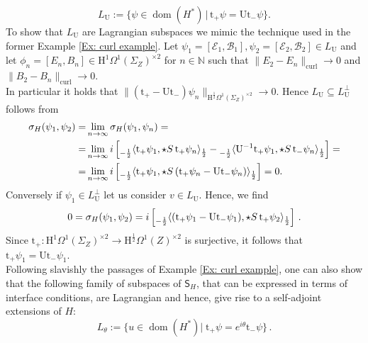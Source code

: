 \begin{Example}
	\begin{equation}
		L_\mathrm{U}:=\{\psi\in \operatorname{dom}(H^*)\,|\, \mathrm{t}_+\psi=\mathrm{U}\mathrm{t}_-\psi  \}.
	\end{equation}
	To show that $L_\mathrm{U}$ are Lagrangian subspaces we mimic the technique used in the former Example \ref{Ex: curl example}. Let $\psi_1=[\mathscr{E}_1,\mathscr{B}_1],\psi_2=[\mathscr{E}_2,\mathscr{B}_2]\in L_\mathrm{U}$ and let $\phi_n=[E_n,B_n]\in \mathrm{H}^1\Omega^1(\Sigma_Z)^{\times 2}$ for $n\in\mathbb{N}$ such that $\|E_2-E_n\|_{\operatorname{curl}}\to 0$ and $\|B_2-B_n\|_{\operatorname{curl}}\to 0$.\\ In particular it holds that $\|(\mathrm{t}_+-\mathrm{U}\mathrm{t}_-)\psi_n\|_{\mathrm{H}^{\frac12}\Omega^1(\Sigma_Z)^{\times 2}}\to 0$. Hence $L_\mathrm{U}\subseteq L_\mathrm{U}^\perp$ follows from
	\begin{align}
	\nonumber	\sigma_H (\psi_1,\psi_2)=&\lim_{n\to \infty} \sigma_H (\psi_1,\psi_n)=\\ =&\lim_{n\to \infty} i\left[	\prescript{}{-\frac{1}{2}}{\langle} \mathrm{t}_+\psi_1,\star S\,\mathrm{t}_+\psi_n \rangle_\frac12-\prescript{}{-\frac{1}{2}}{\langle} \mathrm{U}^{-1}\mathrm{t}_+\psi_1,\star S\,\mathrm{t}_-\psi_n \rangle_\frac12	\right]=\\
	\nonumber =&\lim_{n\to \infty} i\left[	\prescript{}{-\frac{1}{2}}{\langle} \mathrm{t}_+\psi_1,\star S\,(\mathrm{t}_+\psi_n-\mathrm{U}\mathrm{t}_-\psi_n) \rangle_\frac12	\right]=0.
	\end{align}
	Conversely if $\psi_1\in L_\mathrm{U}^\perp$ let us consider $v\in L_\mathrm{U}$.
	Hence, we find
	\begin{align*}
	0=\sigma_H (\psi_1,\psi_2)= i\left[	\prescript{}{-\frac{1}{2}}{\langle} (\mathrm{t}_+\psi_1-\mathrm{U}\mathrm{t}_-\psi_1),\star S\,\mathrm{t}_+\psi_2 \rangle_\frac12	\right]\,.	
	\end{align*}
	Since $\mathrm{t}_+\colon\mathrm{H}^1\Omega^1(\Sigma_Z)^{\times 2}\to \mathrm{H}^{\frac12}\Omega^1(Z)^{\times 2}$ is surjective, it follows that $\mathrm{t}_+\psi_1=\mathrm{U}\mathrm{t}_-\psi_1$.\\
	
	Following slavishly the passages of Example \ref{Ex: curl example}, one can also show that the following family of subspaces of $\mathsf{S}_H$, that can be expressed in terms of interface conditions, are Lagrangian and hence, give rise to a self-adjoint extensions of $H$:
	\begin{equation}
		L_{\theta}:=\lbrace
		u\in\operatorname{dom}(H^*)|\;\mathrm{t}_+\psi=e^{i\theta}\mathrm{t}_-\psi\rbrace\,.
	\end{equation}
	
	
\end{Example}


